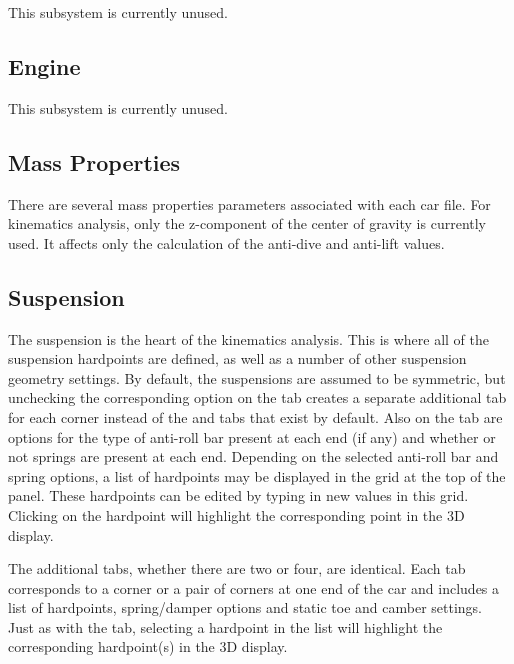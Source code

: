 This subsystem is currently unused.

\subsection{Engine} \label{ssec:engine}

This subsystem is currently unused.

\subsection{Mass Properties} \label{ssec:massProperties}

There are several mass properties parameters associated with each car file.  For kinematics analysis, only the z-component of the center of gravity is currently used.  It affects only the calculation of the anti-dive and anti-lift values.


\subsection{Suspension} \label{ssec:suspension}

The suspension is the heart of the kinematics analysis.  This is where all of the suspension hardpoints are defined, as well as a number of other suspension geometry settings.  By default, the suspensions are assumed to be symmetric, but unchecking the corresponding option on the  tab creates a separate additional tab for each corner instead of the  and  tabs that exist by default.  Also on the  tab are options for the type of anti-roll bar present at each end (if any) and whether or not  springs are present at each end.  Depending on the selected anti-roll bar and  spring options, a list of hardpoints may be displayed in the grid at the top of the panel.  These hardpoints can be edited by typing in new values in this grid.  Clicking on the hardpoint will highlight the corresponding point in the 3D display.

The additional tabs, whether there are two or four, are identical.  Each tab corresponds to a corner or a pair of corners at one end of the car and includes a list of hardpoints, spring/damper options and static toe and camber settings.  Just as with the  tab, selecting a hardpoint in the list will highlight the corresponding hardpoint(s) in the 3D display.

